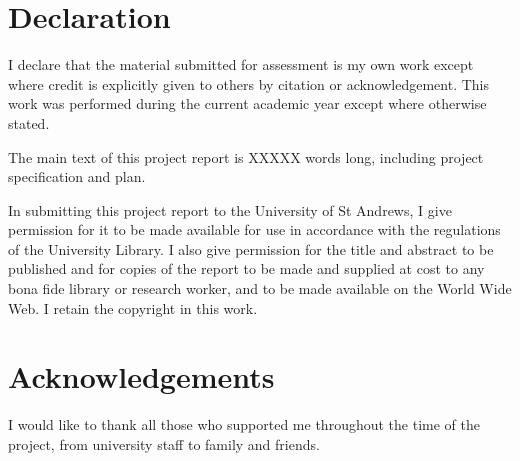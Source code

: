 

\section*{Declaration}
I declare that the material submitted for assessment is my own work except where credit is explicitly given to others by citation or acknowledgement. This work was performed during the current academic year except where otherwise stated.
\par \vspace{\baselineskip}
The main text of this project report is XXXXX words
long, including project specification and plan.
\par \vspace{\baselineskip}
In submitting this project report to the University of St
Andrews, I give permission for it to be made available
for use in accordance with the regulations of the University
Library. I also give permission for the title and abstract
to be published and for copies of the report to be made and
supplied at cost to any bona fide library or research worker,
and to be made available on the World Wide Web. I retain the copyright in this work.

\section*{Acknowledgements}
I would like to thank all those who supported me throughout the time of the project, from university staff to family and friends.